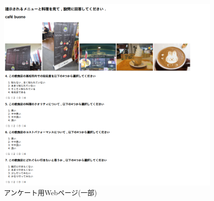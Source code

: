	\begin{figure}[H]
		\centering
		\includegraphics[width=12cm]{./figure/questionnaire.png}
		\caption{アンケート用Webページ(一部)\label{fig:questionnaire}}
	\end{figure}
	\newpage

